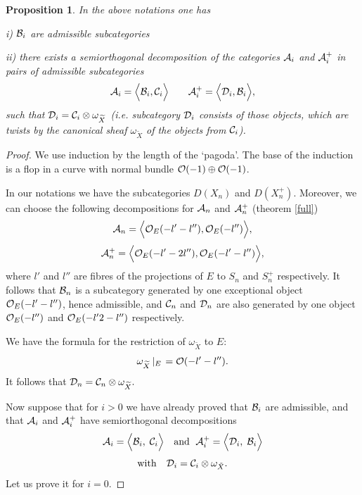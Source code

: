\documentclass[12pt]{article}
\newtheorem{proposition}[theorem]{Proposition}
\begin{document}
\begin{proposition}\label{asub}  In the above notations one has

i) ${\cal B}_i$ are admissible subcategories

ii) there exists  a semiorthogonal decomposition of the categories
${\cal A}_i$ and ${\cal A}^+_i $ in pairs of admissible subcategories
$${\cal A}_i=\Bigl\langle{\cal B}_i,{\cal C}_i\Bigr\rangle\qquad{\cal A}^+_i=\Bigl\langle{\cal D}_i,{\cal B}_i\Bigr\rangle ,$$
such that ${\cal D}_i={\cal C}_i\otimes\omega_{\widetilde X}$
(i.e. subcategory ${\cal D}_i$ consists of those objects, which are twists by the canonical sheaf $\omega_{\widetilde X}$
of the objects from ${\cal C}_i$).
\end{proposition}
\begin{proof} We use induction by the length of the `pagoda'. The base of the induction is a flop in a curve with normal bundle ${\cal O}(-1)\oplus{\cal O}(-1)$.

In our notations we have the subcategories $D(X_n)$ and $D(X^+_n)$. Moreover, we can choose the following decompositions for ${\cal A}_n$ and  ${\cal A}^+_n$
(theorem \ref{full})
$${\cal A}_n=\Bigl\langle {\cal O}_E(-l'-l''),{\cal O}_E(-l'')\Bigr\rangle ,$$
$${\cal A}^+_n=\Bigl\langle {\cal O}_E(-l'-2l''),{\cal O}_E(-l'-l'')\Bigr\rangle ,$$
where $l'$ and $l''$ are fibres of the projections of $E$ to $S_n$ and $S^+_n$ respectively. It follows that ${\cal B}_n$ is a subcategory generated by one exceptional object ${\cal O}_E(-l'-l'')$, hence admissible, and ${\cal C}_n$ and
${\cal D}_n$ are also generated by one object ${\cal O}_E(-l'')$ and  ${\cal O}_E(-l'2-l'')$  respectively.

We have the formula for the restriction of $\omega_{\widetilde X}$ to $E$:
$$\omega_{\widetilde X}\left|_E\right.={\cal O}(-l'-l'').$$
It follows that ${\cal D}_n={\cal C}_n\otimes\omega_{\widetilde X}.$

























Now suppose that for $i>0$ we have already proved that ${\cal B}_i$ are admissible, and that ${\cal A}_i$ and ${\cal A}_i^+$ have semiorthogonal decompositions
$$
{\cal A}_i=\Bigl\langle {\cal B}_i,\; {\cal C}_i\Bigl\rangle\quad\mbox{and }\; {\cal A}_i^+=\Bigl\langle {\cal D}_i,\; {\cal B}_i\Bigl\rangle
$$
$$
\mbox{with}\quad{\cal D}_i={\cal C}_i\otimes\omega_{\tilde X}.
$$
Let us prove it for $i=0$.


\end{proof}
\end{document}
